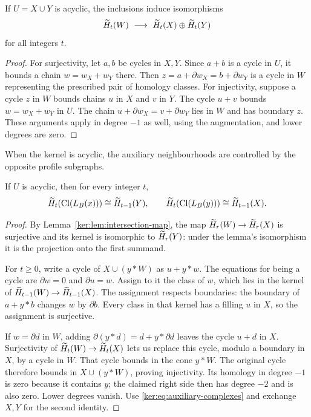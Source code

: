\begin{lemma}\label{ker:lem:intersection-map}
If \(U=X\cup Y\) is acyclic, the inclusions induce isomorphisms
\[
 \Ht_t(W)\ \longrightarrow\ \Ht_t(X)\oplus\Ht_t(Y)
\]
for all integers \(t\).
\end{lemma}
\begin{proof}
For surjectivity, let \(a,b\) be cycles in \(X,Y\).
Since \(a+b\) is a cycle in \(U\), it bounds a chain
\(w=w_X+w_Y\) there. Then
\(z=a+\partial w_X=b+\partial w_Y\) is a cycle in \(W\)
representing the prescribed pair of homology classes.
For injectivity, suppose a cycle \(z\) in \(W\) bounds chains
\(u\) in \(X\) and \(v\) in \(Y\). The cycle \(u+v\) bounds
\(w=w_X+w_Y\) in \(U\). The chain
\(u+\partial w_X=v+\partial w_Y\) lies in \(W\) and has
boundary \(z\). These arguments apply in degree \(-1\) as well,
using the augmentation, and lower degrees are zero.
\end{proof}

When the kernel is acyclic, the auxiliary neighbourhoods are controlled by the opposite profile subgraphs.

\begin{theorem}\label{ker:thm:auxiliary-links}
If \(U\) is acyclic, then for every integer \(t\),
\[
 \widetilde H_t(\operatorname{Cl}(L_B(x)))\cong\widetilde H_{t-1}(Y),\qquad
 \widetilde H_t(\operatorname{Cl}(L_B(y)))\cong\widetilde H_{t-1}(X).
\]
\end{theorem}
\begin{proof}
By Lemma~\ref{ker:lem:intersection-map}, the map
\(\widetilde H_r(W)\to\widetilde H_r(X)\) is surjective and its kernel is
isomorphic to \(\widetilde H_r(Y)\): under the lemma's isomorphism
it is the projection onto the first summand.

For \(t\geq0\), write a cycle of \(X\cup(y*W)\) as \(u+y*w\).
The equations for being a cycle are
\(\partial w=0\) and \(\partial u=w\).
Assign to it the class of \(w\), which lies in the kernel of
\(\widetilde H_{t-1}(W)\to\widetilde H_{t-1}(X)\).
The assignment respects boundaries: the boundary of \(a+y*b\)
changes \(w\) by \(\partial b\).
Every class in that kernel has a filling \(u\) in \(X\), so
the assignment is surjective.

If \(w=\partial d\) in \(W\), adding
\(\partial(y*d)=d+y*\partial d\) leaves the cycle \(u+d\) in \(X\).
Surjectivity of \(\widetilde H_t(W)\to\widetilde H_t(X)\) lets us replace this
cycle, modulo a boundary in \(X\), by a cycle in \(W\).
That cycle bounds in the cone \(y*W\).
The original cycle therefore bounds in \(X\cup(y*W)\),
proving injectivity. Its homology in degree \(-1\) is zero
because it contains \(y\); the claimed right side then has
degree \(-2\) and is also zero. Lower degrees vanish.
Use \eqref{ker:eq:auxiliary-complexes} and exchange \(X,Y\)
for the second identity.
\end{proof}

